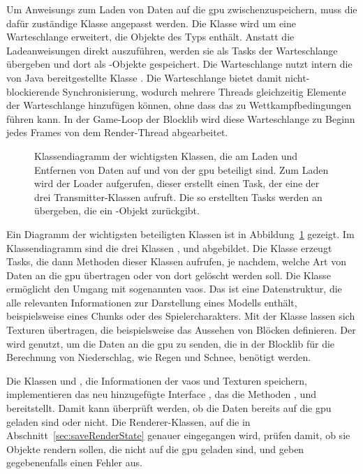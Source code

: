 Um \glspl{Anweisung} zum Laden von Daten auf die \ac{gpu} zwischenzuspeichern, muss die dafür zuständige Klasse  angepasst werden. Die Klasse wird um eine Warteschlange erweitert, die Objekte des Typs  enthält. Anstatt die Ladeanweisungen direkt auszuführen, werden sie als Tasks der Warteschlange übergeben und dort als -Objekte gespeichert. Die Warteschlange nutzt intern die von Java bereitgestellte Klasse . Die Warteschlange bietet damit nicht-blockierende Synchronisierung, wodurch mehrere Threads gleichzeitig Elemente der Warteschlange hinzufügen können, ohne dass das zu Wettkampfbedingungen führen kann. In der Game-Loop der Blocklib wird diese Warteschlange zu Beginn jedes Frames von dem Render-Thread abgearbeitet.

\begin{figure}
	\centering
	
	\caption[Klassendiagramm der wichtigsten Klassen, die am Laden und Entfernen von Daten auf und von der  beteiligt sind.]{Klassendiagramm der wichtigsten Klassen, die am Laden und Entfernen von Daten auf und von der \ac{gpu} beteiligt sind. Zum Laden wird der Loader aufgerufen, dieser erstellt einen Task, der eine der drei Transmitter-Klassen aufruft. Die so erstellten Tasks werden an  übergeben, die ein -Objekt zurückgibt.}\label{fig:loaderDiagram}
\end{figure}
Ein Diagramm der wichtigsten beteiligten Klassen ist in Abbildung~\ref{fig:loaderDiagram} gezeigt. Im Klassendiagramm sind die drei Klassen ,  und  abgebildet. Die Klasse  erzeugt Tasks, die dann Methoden dieser Klassen aufrufen, je nachdem, welche Art von Daten an die \ac{gpu} übertragen oder von dort gelöscht werden soll. Die Klasse  ermöglicht den Umgang mit sogenannten \acp{vao}. Das ist eine Datenstruktur, die alle relevanten Informationen zur Darstellung eines Modells enthält, beispielsweise eines Chunks oder des Spielercharakters. Mit der Klasse  lassen sich Texturen übertragen, die beispielsweise das Aussehen von Blöcken definieren. Der  wird genutzt, um die Daten an die \ac{gpu} zu senden, die in der Blocklib für die Berechnung von Niederschlag, wie Regen und Schnee, benötigt werden.

Die Klassen  und , die Informationen der \acp{vao} und Texturen speichern, implementieren das neu hinzugefügte Interface , das die Methoden 	, 
 und 
 bereitstellt. Damit kann überprüft werden, ob die Daten bereits auf die \ac{gpu} geladen sind oder nicht. Die Renderer-Klassen, auf die in Abschnitt~\ref{sec:saveRenderState} genauer eingegangen wird, prüfen damit, ob sie Objekte rendern sollen, die nicht auf die \ac{gpu} geladen sind, und geben gegebenenfalls einen Fehler aus.

